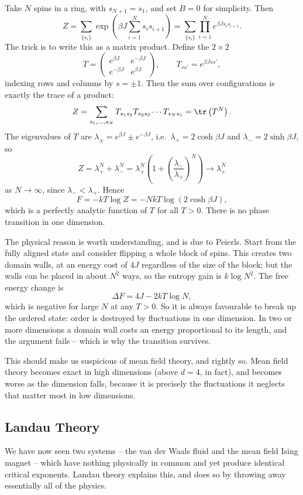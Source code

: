 Take $N$ spins in a ring, with $s_{N+1} = s_1$, and set $B = 0$ for simplicity. Then
$$
Z = \sum_{\{s_i\}}\exp\left(\beta J \sum_{i=1}^N s_i s_{i+1}\right) = \sum_{\{s_i\}}\prod_{i=1}^N e^{\beta J s_i s_{i+1}}.
$$
The trick is to write this as a matrix product. Define the $2\times 2$ 
$$
T = \begin{pmatrix} e^{\beta J} & e^{-\beta J}\\ e^{-\beta J} & e^{\beta J}\end{pmatrix}, \qquad T_{s s'} = e^{\beta J s s'},
$$
indexing rows and columns by $s = \pm 1$. Then the sum over configurations is exactly the trace of a product:
$$
Z = \sum_{s_1,\dots,s_N}T_{s_1s_2}T_{s_2s_3}\cdots T_{s_Ns_1} = \tr\left(T^N\right).
$$
The eigenvalues of $T$ are $\lambda_\pm = e^{\beta J}\pm e^{-\beta J}$, i.e.\ $\lambda_+ = 2\cosh\beta J$ and $\lambda_- = 2\sinh\beta J$, so
$$
Z = \lambda_+^N + \lambda_-^N = \lambda_+^N\left(1 + \left(\frac{\lambda_-}{\lambda_+}\right)^N\right) \to \lambda_+^N
$$
as $N \to \infty$, since $\lambda_- < \lambda_+$. Hence
$$
F = -kT\log Z = -NkT\log(2\cosh\beta J),
$$
which is a perfectly analytic function of $T$ for all $T > 0$. There is no phase transition in one dimension.

The physical reason is worth understanding, and is due to Peierls. Start from the fully aligned state and consider flipping a whole block of spins. This creates two domain walls, at an energy cost of $4J$ regardless of the size of the block; but the walls can be placed in about $N^2$ ways, so the entropy gain is $k\log N^2$. The free energy change is
$$
\Delta F = 4J - 2kT\log N,
$$
which is negative for large $N$ at any $T > 0$. So it is always favourable to break up the ordered state: order is destroyed by fluctuations in one dimension. In two or more dimensions a domain wall costs an energy proportional to its length, and the argument fails -- which is why the transition survives.

This should make us suspicious of mean field theory, and rightly so. Mean field theory becomes exact in high dimensions (above $d = 4$, in fact), and becomes worse as the dimension falls, because it is precisely the fluctuations it neglects that matter most in low dimensions.

\subsection{Landau Theory}

We have now seen two systems -- the van der Waals fluid and the mean field Ising magnet -- which have nothing physically in common and yet produce identical critical exponents. Landau theory explains this, and does so by throwing away essentially all of the physics.

